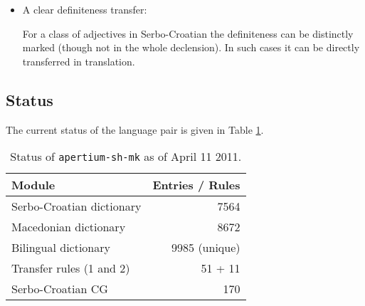 \documentclass{book}
\begin{document}
\begin{itemize}
{U sastavu Vojske Srbije $\rightarrow$ Во составот на Српската војска\footnote{The article in Macedonian
attaches to the first constituent of the noun phrase}

[in] [composition] [of Serbian Army] $\rightarrow$ [In] [composition{\sc.def}] [of Serbian Army]

(In the composition of the Serbian Army)

}

The definite article in Macedonian has no analogy in Serbo-Croatian (except to some extent the definiteness of adjectives). This transfer rule infers definiteness for a common noun preceding
a proper noun in genitive.

\item A clear definiteness transfer:


For a class of adjectives in Serbo-Croatian the definiteness can be
distinctly marked (though not in the whole declension). 
In such cases it can be directly transferred in translation.
\end{itemize}

\subsection*{Status}
The current status of the language pair is given in Table \ref{tab:status}.

\begin{table}
\begin{center}
\caption{Status of \texttt{apertium-sh-mk} as of April 11 2011.}
\label{tab:status}
\begin{tabular}{l|r}
Module & Entries / Rules \\
\hline
Serbo-Croatian dictionary & 7564 \\
Macedonian dictionary & 8672 \\
Bilingual dictionary & 9985 (unique) \\
Transfer rules (1 and 2) & 51 + 11 \\
Serbo-Croatian CG & 170 \\
\hline
\end{tabular}
\end{center}
\end{table}
\end{document}

